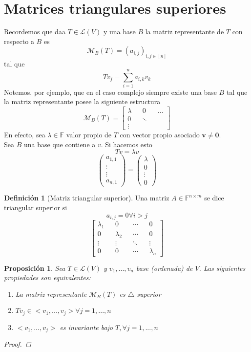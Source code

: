 \documentclass[11pt]{book}
\renewcommand{\vec}[1]{\mathbf{#1}}
\newcommand{\set}[1]{\mathbb{#1}}
\newtheorem{prop}[thm]{Proposición}
\theoremstyle{definition}
\newtheorem{defn}{Definición}[section]
\begin{document}
\section{Matrices triangulares superiores}
Recordemos que daa $T\in\mathcal{L}(V)$ y una base $B$ la matriz representante de $T$ con respecto a $B$ es
\[\mathcal{M}_B(T)=(a_{i,j})_{i,j\in[n]}\]
tal que 
\[Tv_j=\sum^n_{i=1}a_{i,k}v_k\]
Notemos, por ejemplo, que en el caso complejo siempre existe una base $B$ tal que la matriz representante posee la siguiente estructura
\[\mathcal{M}_B(T)=\begin{bmatrix}\lambda && 0 && \ldots\\ 0 && \ddots\\ \vdots \end{bmatrix}\]
En efecto, sea $\lambda\in\set{F}$ valor propio de $T$ con vector propio asociado $\vec{v}\neq\vec{0}$.\\
Sea $B$ una base que contiene a $v$. Si hacemos esto
\[Tv=\lambda v\]
\[\begin{pmatrix}
	a_{1,1}\\
	\vdots\\
	\vdots\\
	a_{n,1}
\end{pmatrix}=\begin{pmatrix}
	\lambda\\
	0\\
	\vdots\\
	0
\end{pmatrix}\]
\begin{defn}[Matriz triangular superior]
	Una matriz $A\in\set{F}^{n\times m}$ se dice triangular superior si
	\[a_{i,j}=0\forall i>j\]
	\[\begin{bmatrix}
		\lambda_1 && 0 && \cdots && 0\\
		0 && \lambda_2 && \cdots && 0\\
		\vdots && \vdots && \ddots && \vdots\\
		0 && 0 && \cdots && \lambda_n
	\end{bmatrix}\]
\end{defn}
\begin{prop}
	Sea $T\in\mathcal{L}(V)$ y $v_1,...,v_n$ base (ordenada) de $V$. Las siguientes propiedades son equivalentes:
	\begin{enumerate}[label=\alph*)]
		\item La matriz representante $\mathcal{M}_B(T)$ es $\triangle$ superior

		\item $Tv_j\in<v_1,...,v_j>\forall j=1,...,n$

		\item $<v_1,...,v_j>$ es invariante bajo $T, \forall j=1,...,n$
	\end{enumerate}
	\begin{proof}
		
	\end{proof}
\end{prop}
\end{document}
